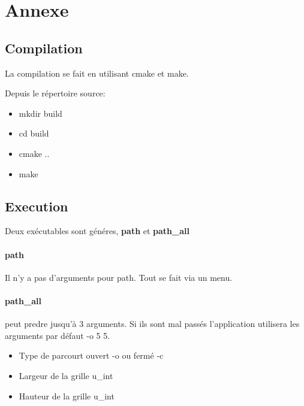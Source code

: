 \section{Annexe}
\subsection{Compilation}
La compilation se fait en utilisant cmake et make.

Depuis le répertoire source:
\begin{itemize}
\item mkdir build
\item cd build
\item cmake ..
\item make
\end{itemize}
\subsection{Execution}
Deux exécutables sont généres, \textbf{path} et \textbf{path\_all}

\paragraph{path}Il n'y a pas d'arguments pour path. Tout se fait via un menu.
\paragraph{path\_all} peut predre jusqu'à 3 arguments. Si ils sont mal passés l'application utilisera les arguments par défaut -o 5 5.
\begin{itemize}
\item Type de parcourt ouvert -o ou fermé -c
\item Largeur de la grille u\_int
\item Hauteur de la grille u\_int
\end{itemize}
